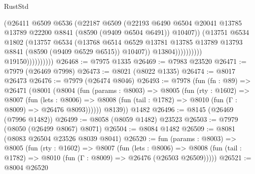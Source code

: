 \begin{lexlean}{RustStd}
\begin{coremodule}
                                        (@26411
                                          @6509
                                          @6536
                                          (@22187
                                            @6509
                                            (@22193
                                              @6490
                                              @6504
                                              @20041
                                              @13785
                                              @13789
                                              @22200
                                              @8841
                                              (@8590 (@9409 @6504 @6491))
                                              @10407))
                                          (@13751
                                            @6534
                                            @1802
                                            (@13757
                                              @6534
                                              (@13768
                                                @6514
                                                @6529
                                                @13781
                                                @13785
                                                @13789
                                                @13793
                                                @8841
                                                (@8590 (@9409 @6529 @6515))
                                                @10407))
                                            @13804))))))))))
                        @19150))))))))))
@26468 := @7975 @1335
@26469 := @7983 @23520
@26471 := @7979 (@26469 @7998)
@26473 := @8021 (@8022 @1335)
@26474 := @8017 @26473
@26476 := @7979 (@26474 @8046)
@26493 := @7978
    (fun (fn : @89) =>
    @26471
      (@8001
        (@8004
          (fun (params : @8003) =>
          @8005
            (fun (rty : @1602) =>
            @8007
              (fun (lets : @8006) =>
              @8008 (fun (tail : @1782) => @8010 (fun (Γ : @8009) => @26476 @8093))))))
        @8139))
    @1482
@26496 := @8145 (@26469 (@7996 @1482))
@26499 := @8058 (@8059 @1482) @23523
@26503 := @7979 (@8050 (@26499 @8067) @8071)
@26504 := @8084 @1482
@26509 := @8081 (@8083 @26504 @23526 @8039 @8041)
@26520 := fun (params : @8003) =>
  @8005
    (fun (rty : @1602) =>
    @8007
      (fun (lets : @8006) =>
      @8008 (fun (tail : @1782) => @8010 (fun (Γ : @8009) => @26476 (@26503 @26509)))))
@26521 := @8004 @26520

\end{coremodule}
\end{lexlean}
